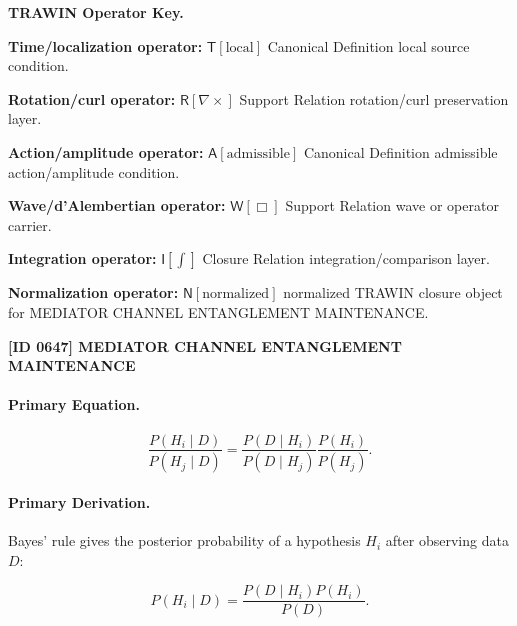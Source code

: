 \par\vspace{0.45\baselineskip}
\noindent\begin{minipage}[t]{\linewidth}
\begingroup
\small
\raggedright
\textbf{TRAWIN Operator Key.}\par
\noindent\textbf{Time/localization operator:} $\mathsf{T}\!\left[\mathrm{local}\right]$ Canonical Definition local source condition.\par
\noindent\textbf{Rotation/curl operator:} $\mathsf{R}\!\left[\nabla\times\right]$ Support Relation rotation/curl preservation layer.\par
\noindent\textbf{Action/amplitude operator:} $\mathsf{A}\!\left[\mathrm{admissible}\right]$ Canonical Definition admissible action/amplitude condition.\par
\noindent\textbf{Wave/d'Alembertian operator:} $\mathsf{W}\!\left[\Box\right]$ Support Relation wave or operator carrier.\par
\noindent\textbf{Integration operator:} $\mathsf{I}\!\left[\int\right]$ Closure Relation integration/comparison layer.\par
\noindent\textbf{Normalization operator:} $\mathsf{N}\!\left[\mathrm{normalized}\right]$ normalized TRAWIN closure object for MEDIATOR CHANNEL ENTANGLEMENT MAINTENANCE.\par
\endgroup
\end{minipage}

\clearpage
\noindent\textbf{[ID 0647] MEDIATOR CHANNEL ENTANGLEMENT MAINTENANCE}\par
\vspace{0.35em}
\paragraph{Primary Equation.}
\begin{equation}
\frac{P(H_i\mid D)}
{P(H_j\mid D)}
=
\frac{P(D\mid H_i)}
{P(D\mid H_j)}
\frac{P(H_i)}
{P(H_j)} .
\end{equation}

\paragraph{Primary Derivation.}
Bayes' rule gives the posterior probability of a hypothesis $H_i$ after observing data $D$:

\begin{equation}
P(H_i\mid D)
=
\frac{P(D\mid H_i)P(H_i)}
{P(D)} .
\end{equation}

